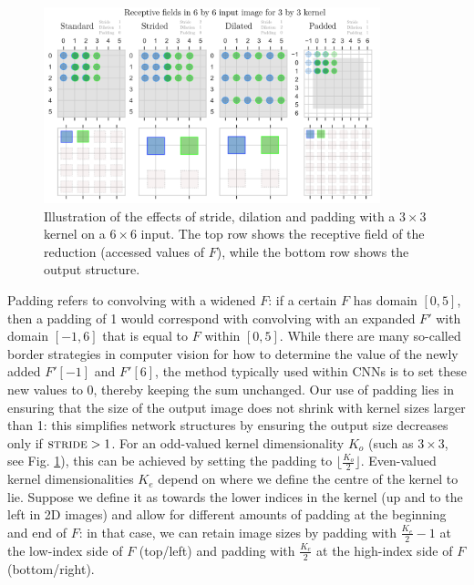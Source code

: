 \documentclass[a4paper, 12pt]{report}
\begin{document}
\begin{figure}[h!]
	\center
  \includegraphics[width=0.87\textwidth]{figures/stride-dilation-padding.png}
  \caption{Illustration of the effects of stride, dilation and padding with a $3\times3$ kernel on a $6\times6$ input. The top row shows the receptive field of the reduction (accessed values of $F$), while the bottom row shows the output structure.}
  \label{fig:stride-dilation-padding}
\end{figure}

\noindent
Padding refers to convolving with a widened $F$: if a certain $F$ has domain $[0, 5]$, then a padding of 1 would correspond with convolving with an expanded $F'$ with domain $[-1, 6]$ that is equal to $F$ within $[0, 5]$. While there are many so-called border strategies \cite{gonzalez2017} in computer vision for how to determine the value of the newly added $F'[-1]$ and $F'[6]$, the method typically used within CNNs is to set these new values to 0, thereby keeping the sum unchanged. 
Our use of padding lies in ensuring that the size of the output image does not shrink with kernel sizes larger than 1: this simplifies network structures by ensuring the output size decreases only if $\textsc{stride}>1$. For an odd-valued kernel dimensionality $K_o$ (such as $3\times3$, see Fig. \ref{fig:stride-dilation-padding}), this can be achieved by setting the padding to $\lfloor\frac{K_o}{2}\rfloor$. Even-valued kernel dimensionalities $K_e$ depend on where we define the centre of the kernel to lie. Suppose we define it as towards the lower indices in the kernel (up and to the left in 2D images) and allow for different amounts of padding at the beginning and end of $F$: in that case, we can retain image sizes by padding with $\frac{K_e}{2}-1$ at the low-index side of $F$ (top/left) and padding with $\frac{K_e}{2}$ at the high-index side of $F$ (bottom/right).
\end{document}

